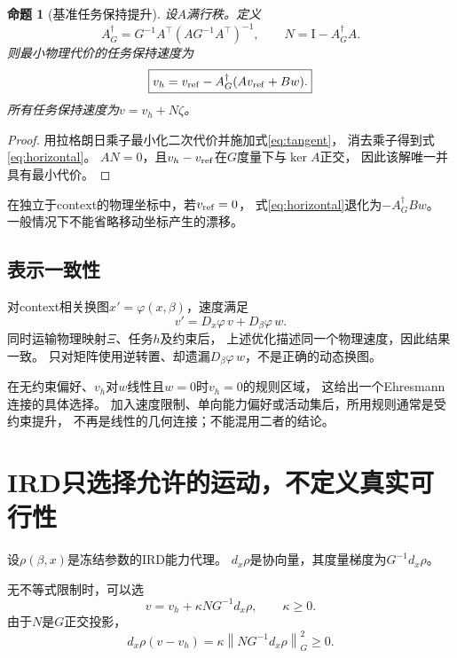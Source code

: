 \documentclass[UTF8,11pt,a4paper,fontset=fandol]{ctexart}
\numberwithin{equation}{section}
\newtheorem{proposition}[theorem]{命题}
\theoremstyle{definition}
\newcommand{\Id}{\mathrm I}
\newcommand{\norm}[1]{\left\lVert#1\right\rVert}
\begin{document}
\begin{proposition}[基准任务保持提升]
设$A$满行秩。定义
\begin{equation}
 A_G^\dagger=G^{-1}A^\top(AG^{-1}A^\top)^{-1},
 \qquad N=\Id-A_G^\dagger A.
\end{equation}
则最小物理代价的任务保持速度为
\begin{equation}
 \boxed{
 v_h=v_{\rm ref}
 -A_G^\dagger(Av_{\rm ref}+Bw).
 }
 \label{eq:horizontal}
\end{equation}
所有任务保持速度为$v=v_h+N\zeta$。
\end{proposition}

\begin{proof}
用拉格朗日乘子最小化二次代价并施加式\eqref{eq:tangent}，
消去乘子得到式\eqref{eq:horizontal}。
$AN=0$，且$v_h-v_{\rm ref}$在$G$度量下与$\ker A$正交，
因此该解唯一并具有最小代价。
\end{proof}

在独立于context的物理坐标中，若$v_{\rm ref}=0$，
式\eqref{eq:horizontal}退化为$-A_G^\dagger Bw$。
一般情况下不能省略移动坐标产生的漂移。

\subsection{表示一致性}

对context相关换图$x'=\varphi(x,\beta)$，速度满足
\begin{equation}
 v'=D_x\varphi\,v+D_\beta\varphi\,w.
\end{equation}
同时运输物理映射$\Xi$、任务$h$及约束后，
上述优化描述同一个物理速度，因此结果一致。
只对矩阵使用逆转置、却遗漏$D_\beta\varphi\,w$，不是正确的动态换图。

在无约束偏好、$v_h$对$w$线性且$w=0$时$v_h=0$的规则区域，
这给出一个Ehresmann连接的具体选择。
加入速度限制、单向能力偏好或活动集后，所用规则通常是受约束提升，
不再是线性的几何连接；不能混用二者的结论。

\section{IRD只选择允许的运动，不定义真实可行性}

设$\rho(\beta,x)$是冻结参数的IRD能力代理。
$d_x\rho$是协向量，其度量梯度为$G^{-1}d_x\rho$。

无不等式限制时，可以选
\begin{equation}
 v=v_h+\kappa N G^{-1}d_x\rho,\qquad \kappa\geq0.
 \label{eq:irdlift}
\end{equation}
由于$N$是$G$正交投影，
\begin{equation}
 d_x\rho(v-v_h)
 =
 \kappa\norm{NG^{-1}d_x\rho}_G^2\geq0.
\end{equation}
\end{document}
